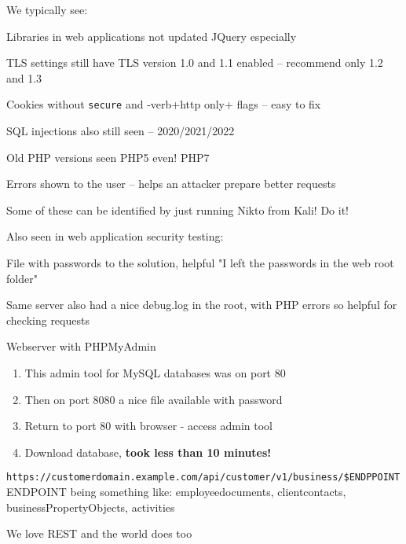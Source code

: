 \documentclass[Screen16to9,17pt]{foils}
\begin{document}


We typically see:
\begin{list2}
\item Libraries in web applications not updated JQuery especially
\item TLS settings still have TLS version 1.0 and 1.1 enabled -- recommend only 1.2 and 1.3
\item Cookies without \verb+secure+ and -verb+http only+ flags -- easy to fix
\item SQL injections also still seen -- 2020/2021/2022
\item Old PHP versions seen PHP5 even! PHP7
\item Errors shown to the user -- helps an attacker prepare better requests
\end{list2}

Some of these can be identified by just running Nikto from Kali! Do it!


Also seen in web application security testing:
\begin{list2}
\item File with passwords to the solution, helpful "I left the passwords in the web root folder"
\item Same server also had a nice debug.log in the root, with PHP errors so helpful for checking requests
\item Webserver with PHPMyAdmin
\begin{enumerate}
\item This admin tool for MySQL databases was on port 80
\item Then on port 8080 a nice file available with password
\item Return to port 80 with browser - access admin tool
\item Download database, {\bf took less than 10 minutes!}
\end{enumerate}
\end{list2}


\verb+https://customerdomain.example.com/api/customer/v1/business/$ENDPPOINT+\\
ENDPOINT being something like: employeedocuments, clientcontacts, businessPropertyObjects, activities

\begin{list2}
\item    We love REST and the world does too
\end{list2}
\end{document}
